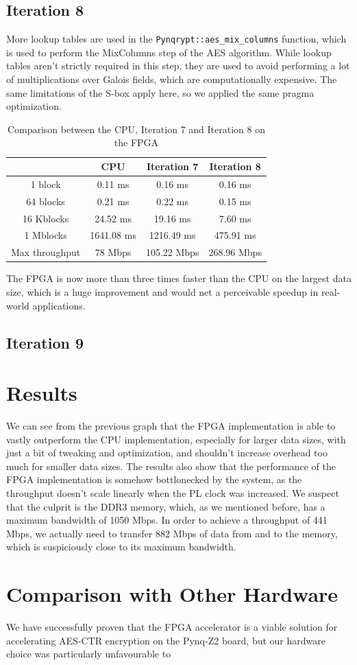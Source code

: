 \documentclass[12pt,oneside,a4paper]{article}
\begin{document}
\subsection{Iteration 8} \label{subsec:iter8}
More lookup tables are used in the {\tt Pynqrypt::aes\_mix\_columns} function, which is used to perform the MixColumns step of the AES algorithm.
While lookup tables aren't strictly required in this step, they are used to avoid performing a lot of multiplications over Galois fields, which are computationally expensive.
The same limitations of the S-box apply here, so we applied the same pragma optimization.

\begin{table}[h!]
	\centering
	\begin{tabular}{cccc}
		\toprule
		 & CPU & Iteration 7 & Iteration 8 \\
		\midrule
		1 block & 0.11 ms & 0.16 ms & 0.16 ms \\
		64 blocks & 0.21 ms & 0.22 ms & 0.15 ms \\
		16 Kblocks & 24.52 ms & 19.16 ms & 7.60 ms \\
		1 Mblocks & 1641.08 ms & 1216.49 ms & 475.91 ms \\
		Max throughput & 78 Mbps & 105.22 Mbps & 268.96 Mbps \\
		\bottomrule
	\end{tabular}
	\caption{Comparison between the CPU, Iteration 7 and Iteration 8 on the FPGA}
\end{table}

The FPGA is now more than three times faster than the CPU on the largest data size, which is a huge improvement and would net a perceivable speedup in real-world applications.

\subsection{Iteration 9} \label{subsec:iter9}


\section{Results} \label{sec:results}
We can see from the previous graph that the FPGA implementation is able to vastly outperform the CPU implementation, especially for larger data sizes, with just a bit of tweaking and optimization, and shouldn't increase overhead too much for smaller data sizes.
The results also show that the performance of the FPGA implementation is somehow bottlonecked by the system, as the throughput doesn't scale linearly when the PL clock was increased.
We suspect that the culprit is the DDR3 memory, which, as we mentioned before, has a maximum bandwidth of 1050 Mbps. In order to achieve a throughput of 441 Mbps, we actually need to transfer 882 Mbps of data from and to the memory, which is suspiciously close to its maximum bandwidth.

\section{Comparison with Other Hardware} \label{sec:conclusions}
We have successfully proven that the FPGA accelerator is a viable solution for accelerating AES-CTR encryption on the Pynq-Z2 board, but our hardware choice was particularly unfavourable to 

\printbibliography
\end{document}
